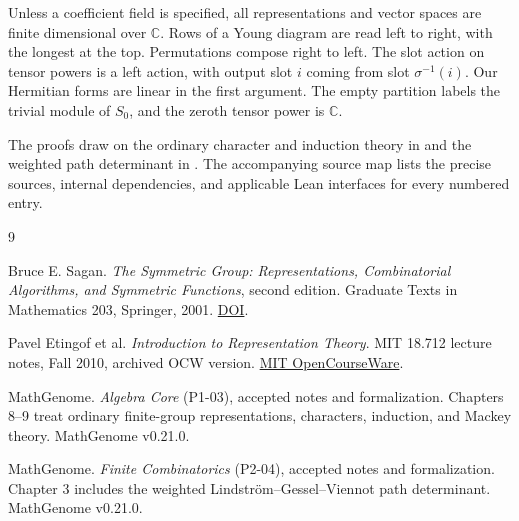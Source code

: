 \documentclass[11pt,oneside,openany]{book}
\theoremstyle{definition}
\theoremstyle{remark}
\begin{document}
Unless a coefficient field is specified, all representations and
vector spaces are finite dimensional over \(\mathbb C\). Rows of
a Young diagram are read left to right, with the longest at the
top. Permutations compose right to left. The slot action on tensor
powers is a left action, with output slot \(i\) coming from
slot \(\sigma^{-1}(i)\). Our Hermitian forms are linear in the first
argument. The empty partition labels the trivial module of \(S_0\),
and the zeroth tensor power is \(\mathbb C\).

The proofs draw on the ordinary character and induction theory in
\cite[Chapters 8--9]{algebra-core} and the weighted path determinant
in \cite[Chapter 3]{finite-combinatorics}. The accompanying source
map lists the precise sources, internal dependencies, and applicable
Lean interfaces for every numbered entry.

\mainmatter





\backmatter
\begin{thebibliography}{9}

Bruce E. Sagan.
\emph{The Symmetric Group: Representations, Combinatorial Algorithms,
and Symmetric Functions}, second edition.
Graduate Texts in Mathematics 203, Springer, 2001.
\href{https://doi.org/10.1007/978-1-4757-6804-6}{DOI}.

Pavel Etingof et al.
\emph{Introduction to Representation Theory}.
MIT 18.712 lecture notes, Fall 2010, archived OCW version.
\href{https://ocw.mit.edu/courses/18-712-introduction-to-representation-theory-fall-2010/resources/mit18_712f10_replect/}{MIT OpenCourseWare}.

MathGenome.
\emph{Algebra Core} (P1-03), accepted notes and formalization.
Chapters 8--9 treat ordinary finite-group representations,
characters, induction, and Mackey theory. MathGenome v0.21.0.

MathGenome.
\emph{Finite Combinatorics} (P2-04), accepted notes and formalization.
Chapter 3 includes the weighted Lindstr\"om--Gessel--Viennot path
determinant. MathGenome v0.21.0.
\end{thebibliography}
\end{document}
